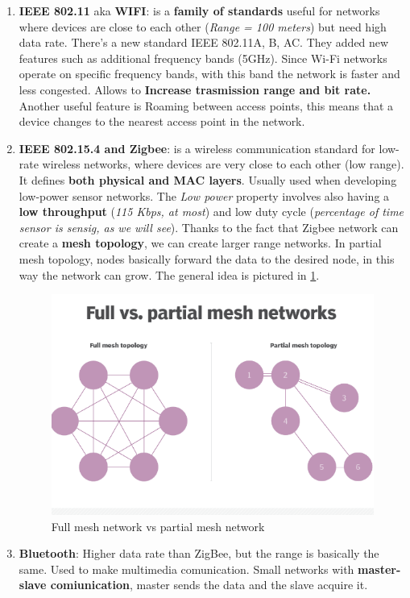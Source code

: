 \documentclass[10pt,a4paper]{report}
\theoremstyle{definition}
\begin{document}
\begin{enumerate}
	\item \textbf{IEEE 802.11} aka \textbf{WIFI}: is a \textbf{family of standards} useful for networks where devices are close to each other (\textit{Range = 100 meters}) but need high data rate. There's a new standard IEEE 802.11A, B, AC. They added new features such as additional frequency bands (5GHz). Since Wi-Fi networks operate on specific frequency bands, with this band the network is faster and less congested. Allows to \textbf{Increase trasmission range and bit rate.} Another useful feature is Roaming between access points, this means that a device changes to the nearest access point in the network.

	
	\item \textbf{IEEE 802.15.4 and Zigbee}: is a wireless communication standard for low-rate wireless networks, where devices are very close to each other (low range). It defines \textbf{both physical and MAC layers}. Usually used when developing low-power sensor networks. The \textit{Low power} property involves also having a \textbf{low throughput} (\textit{115 Kbps, at most}) and low duty cycle (\textit{percentage of time sensor is sensig, as we will see}). Thanks to the fact that Zigbee network can create a \textbf{mesh topology}, we can create larger range networks. In partial mesh topology, nodes basically forward the data to the desired node, in this way the network can grow. The general idea is pictured in \ref{mesh-vs-full}.
	\begin{figure}[h]
		\centering\includegraphics[scale=0.50]{images/Pasted image 20230223100530.png}
		\caption{Full mesh network vs partial mesh network}\label{mesh-vs-full}\end{figure}
	
	
	\item \textbf{Bluetooth}: Higher data rate than ZigBee, but the range is basically the same. Used to make multimedia comunication. Small networks with \textbf{master-slave comiunication}, master sends the data and the slave acquire it.
	
	
\end{enumerate}
\end{document}
